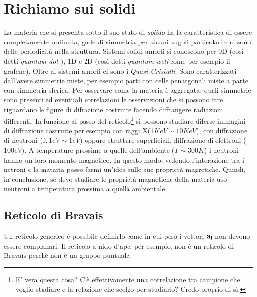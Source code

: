 \documentclass[a4paper,12pt]{article}
\begin{document}
\section{Richiamo sui solidi}
La materia che si presenta sotto il suo stato di \textit{solido} ha la caratteristica di essere completamente ordinata, gode di simmetria per alcuni angoli particolari e ci sono delle periodicità nella struttura. Sistemi solidi amorfi si conoscono per 0D (così detti \textit{quantum dot} ), 1D e 2D (così detti \textit{quantum well} come per esempio il grafene). Oltre ai sistemi amorfi ci sono i \textit{Quasi Cristalli}. Sono caratterizzati dall'avere simmetrie miste, per esempio parti con celle penatgonali miste a parte con simmetria sferica. Per osservare come la materia è aggregata, quali simmetrie sono presenti ed eventuali correlazioni le osservazioni che si possono fare riguardano le figure di difrazione costruite facendo diffrangere radiazioni differenti. In funzione al passo del reticolo\footnote{E' vera questa cosa? C'è effettivamente una correlazione tra campione che voglio studiare e la relazione che scelgo per studiarlo? Credo proprio di sì.} si possono studiare diferse immagini di diffrazione costruite per esempio con raggi X($1 KeV \sim 10KeV$), con diffrazione di neutroni ($0,1 eV\sim 1 eV$) oppure strutture superficiali, diffrazione di elettroni ($100 eV$). A temperature prossime a quelle dell'ambiente ($T\sim 300K$) i neutroni hanno un loro momento magnetico. In questo modo, vedendo l'interazione tra i netroni e la mataria posso farmi un'idea sulle sue proprietà magretiche. Quindi, in conclusione, se devo studiare le proprietà magnetiche della materia uso neutroni a temperatura prossima a quella ambientale. 
\subsection{Reticolo di Bravais}
Un reticolo generico è possibile definirlo come 
in cui però i vettori $\it\bf{a} _i$ non devono essere complanari. Il reticolo a nido d'ape, per esempio, non è un reticolo di Bravais perchè non è un gruppo puntuale.
\end{document}
